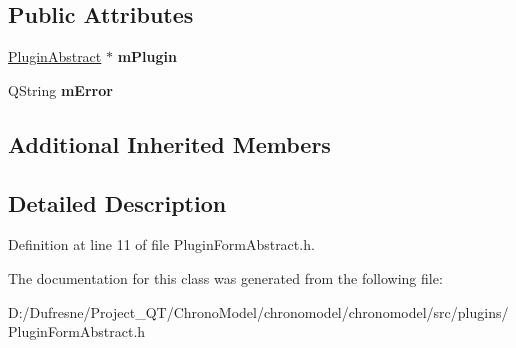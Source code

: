 \subsection*{Public Attributes}
\begin{DoxyCompactItemize}
\item 
\hypertarget{class_plugin_form_abstract_a2a754f52b3c05bf0ddc8b0b47fc2528f}{\hyperlink{class_plugin_abstract}{Plugin\-Abstract} $\ast$ {\bfseries m\-Plugin}}\label{class_plugin_form_abstract_a2a754f52b3c05bf0ddc8b0b47fc2528f}

\item 
\hypertarget{class_plugin_form_abstract_a99d0001c92ac2bec2f50d363b3e7038d}{Q\-String {\bfseries m\-Error}}\label{class_plugin_form_abstract_a99d0001c92ac2bec2f50d363b3e7038d}

\end{DoxyCompactItemize}
\subsection*{Additional Inherited Members}


\subsection{Detailed Description}


Definition at line 11 of file Plugin\-Form\-Abstract.\-h.



The documentation for this class was generated from the following file\-:\begin{DoxyCompactItemize}
\item 
D\-:/\-Dufresne/\-Project\-\_\-\-Q\-T/\-Chrono\-Model/chronomodel/chronomodel/src/plugins/Plugin\-Form\-Abstract.\-h\end{DoxyCompactItemize}
